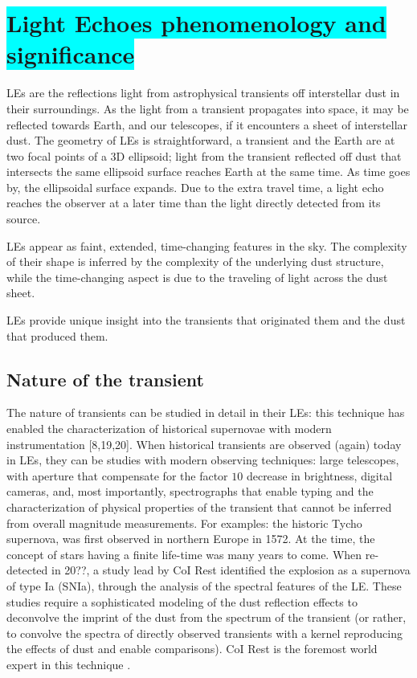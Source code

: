 \documentclass{proposalnsf}
\newcommand{\armin}[1]{\colorbox{cyan}{#1}}
\begin{document}
\section{\armin{ Light Echoes phenomenology and significance}}
LEs are the reflections light from astrophysical transients off interstellar dust in their surroundings.   As the light from a transient propagates into space, it may be reflected towards Earth, and our telescopes, if it encounters a sheet of interstellar dust.  The geometry of LEs is straightforward, a transient and the Earth are at two focal points of a 3D ellipsoid; light from the transient reflected off dust that intersects the same ellipsoid surface reaches Earth at the same time.  As time goes by, the ellipsoidal surface expands.  Due to the extra travel time, a light echo reaches the observer at a later time than the light directly detected from its source.

LEs appear as faint, extended, time-changing features in the sky.  The complexity of their shape is inferred by the complexity of the underlying dust structure, while the time-changing aspect is due to the traveling of light across the dust sheet.

LEs provide unique insight into the transients that originated them and the dust that produced them.  
\subsection {Nature of the transient}
The nature of transients can be studied in detail in their LEs: this technique has enabled the characterization of historical supernovae with modern instrumentation [8,19,20].  When historical transients are observed (again) today in LEs, they can be studies with modern observing techniques: large telescopes, with aperture that compensate for the factor $10$ decrease in brightness, digital cameras, and, most importantly, spectrographs that enable typing and the characterization of physical properties of the transient that cannot be inferred from overall magnitude measurements.  For examples: the historic Tycho supernova, was first observed in northern Europe in 1572.  At the time, the concept of stars having a finite life-time was many years to come.  When re-detected in 20??, a study lead by CoI Rest identified the explosion as a supernova of type Ia (SNIa), through the analysis of the spectral features of the LE.  These studies 
require a sophisticated modeling of the dust reflection effects to deconvolve the imprint of the dust from the spectrum of the transient (or rather, to convolve the spectra of directly observed transients with a kernel reproducing the effects of dust and enable comparisons).  CoI Rest is the foremost world expert in this technique \citep{rest11a}.
\end{document}
